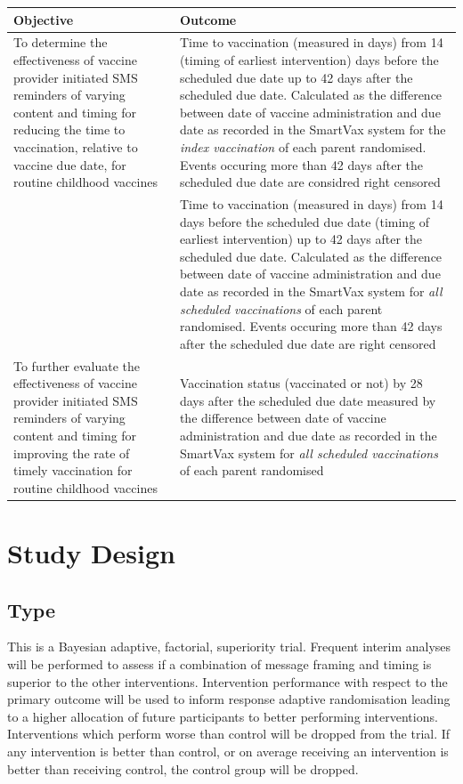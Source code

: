 \documentclass[
  bibliography=totoc]{scrreprt}
\begin{document}
\begin{tabu} to 
\toprule
Objective & Outcome\\
\midrule
To determine the effectiveness of vaccine provider initiated SMS reminders of varying content and timing  for reducing the time to vaccination, relative to vaccine due date, for routine childhood vaccines & Time to vaccination (measured in days) from 14 (timing of earliest intervention) days before the scheduled due date up to 42 days after the scheduled due date. Calculated as the difference between date of vaccine administration and due date as recorded in the SmartVax system for the \textit{index vaccination} of each parent randomised. Events occuring more than 42 days after the scheduled due date are considred right censored\\
\addlinespace\addlinespace
 & Time to vaccination (measured in days) from 14 days before the scheduled due date (timing of earliest intervention) up to 42 days after the scheduled due date. Calculated as the difference between date of vaccine administration and due date as recorded in the SmartVax system for \textit{all scheduled vaccinations} of each parent randomised. Events occuring more than 42 days after the scheduled due date are right censored\\
\addlinespace\addlinespace
To further evaluate the effectiveness of vaccine provider initiated SMS reminders of varying content and timing  for improving the rate of timely vaccination for routine childhood vaccines & Vaccination status (vaccinated or not) by 28 days after the scheduled due date measured by the difference between date of vaccine administration and due date as recorded in the SmartVax system for \textit{all scheduled vaccinations} of each parent randomised\\
\bottomrule
\end{tabu}
\endgroup{}

\hypertarget{study-design}{%
\chapter{Study Design}\label{study-design}}

\hypertarget{type}{%
\section{Type}\label{type}}

This is a Bayesian adaptive, factorial, superiority trial.
Frequent interim analyses will be performed to assess if a combination of message framing and timing is superior to the other interventions.
Intervention performance with respect to the primary outcome will be used to inform response adaptive randomisation leading to a higher allocation of future participants to better performing interventions.
Interventions which perform worse than control will be dropped from the trial.
If any intervention is better than control, or on average receiving an intervention is better than receiving control, the control group will be dropped.
\end{document}
